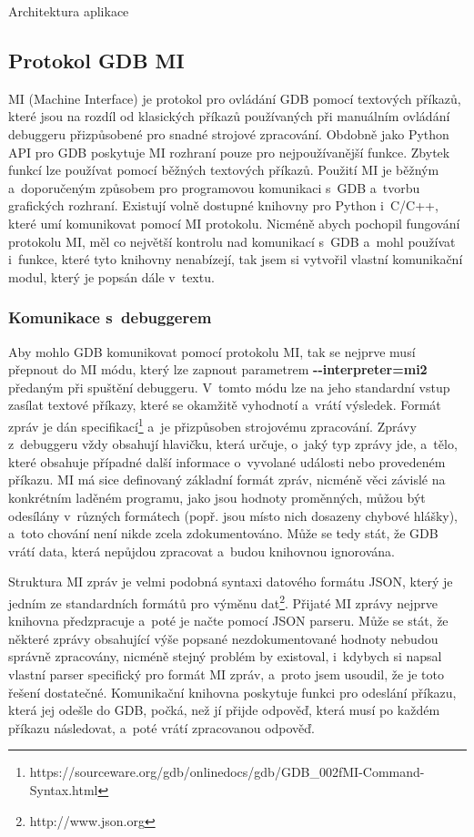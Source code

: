 \documentclass[czech,bachelor,male,python,dept460,hidelinks]{diploma}						%
\newcommand{\parspace}[1][]{
	\ifthenelse{\isempty{#1}}{\vspace{0mm}}{\vspace{#1}}
	\par
}
\begin{document}
\begin{section}{Architektura aplikace}
		\subsection{Protokol GDB MI}
		MI (Machine Interface) je protokol pro ovládání GDB pomocí textových příkazů, které jsou na rozdíl od klasických příkazů používaných při manuálním
		ovládání debuggeru přizpůsobené pro snadné strojové zpracování. Obdobně jako Python API pro GDB poskytuje MI rozhraní pouze pro nejpoužívanější funkce.
		Zbytek funkcí lze používat pomocí běžných textových příkazů. Použití MI je běžným a~doporučeným \cite{gdb-mi-usage} způsobem pro programovou komunikaci
		s~GDB a~tvorbu grafických rozhraní. Existují volně dostupné knihovny pro Python i~C/C++, které umí komunikovat pomocí MI protokolu.
		Nicméně abych pochopil fungování protokolu MI, měl co největší kontrolu nad komunikací s~GDB a~mohl používat i~funkce, které tyto knihovny nenabízejí, tak
		jsem si vytvořil vlastní komunikační modul, který je popsán dále v~textu.
		
		\subsubsection{Komunikace s~debuggerem}
			Aby mohlo GDB komunikovat pomocí protokolu MI, tak se nejprve musí přepnout do MI módu, který lze zapnout parametrem \textbf{-{}-interpreter=mi2}
			předaným při spuštění debuggeru. V~tomto módu lze na jeho standardní vstup zasílat textové příkazy, které se okamžitě vyhodnotí a~vrátí výsledek.
			Formát zpráv je dán specifikací\footnote{https://sourceware.org/gdb/onlinedocs/gdb/GDB\_002fMI-Command-Syntax.html} a~je přizpůsoben strojovému
			zpracování. Zprávy z~debuggeru vždy obsahují hlavičku, která určuje, o~jaký typ zprávy jde, a~tělo, které obsahuje případné další informace
			o~vyvolané události nebo provedeném příkazu. MI má sice definovaný základní formát zpráv, nicméně věci závislé na konkrétním laděném programu,
			jako jsou hodnoty proměnných, můžou být odesílány v~různých formátech (popř. jsou místo nich dosazeny chybové hlášky), a~toto chování není nikde
			zcela zdokumentováno. Může se tedy stát, že GDB vrátí data, která nepůjdou zpracovat a~budou knihovnou ignorována.
			
			\parspace Struktura MI zpráv je velmi podobná syntaxi datového formátu JSON, který je jedním ze standardních formátů pro výměnu
			dat\footnote{http://www.json.org}. Přijaté MI zprávy nejprve knihovna předzpracuje a~poté je načte pomocí JSON parseru.
			Může se stát, že některé zprávy obsahující výše popsané 
			nezdokumentované hodnoty nebudou správně zpracovány, nicméně stejný problém by existoval, i~kdybych si napsal vlastní parser specifický pro formát MI
			zpráv, a~proto jsem usoudil, že je toto řešení dostatečné. Komunikační knihovna poskytuje funkci pro odeslání příkazu, která jej odešle do GDB,
			počká, než jí přijde odpověď, která musí po každém příkazu následovat, a~poté vrátí zpracovanou odpověď.
			

\end{section}
\end{document}
